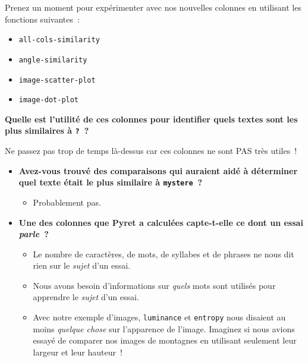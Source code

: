 \documentclass[12pt,a4paper]{article}
\begin{document}
\begin{activitybox}
  Prenez un moment pour expérimenter avec nos nouvelles colonnes en utilisant les fonctions suivantes~:
  \begin{itemize}
    \item \texttt{all-cols-similarity}
    \item \texttt{angle-similarity}
    \item \texttt{image-scatter-plot}
    \item \texttt{image-dot-plot}
  \end{itemize}

  \textbf{Quelle est l'utilité de ces colonnes pour identifier quels textes sont les plus similaires à \texttt{?}~?}
\end{activitybox}

\begin{instructornotes}
  Ne passez pas trop de temps là-dessus car ces colonnes ne sont PAS très utiles~!
\end{instructornotes}

\begin{thinkbox}
  \begin{itemize}
    \item \textbf{Avez-vous trouvé des comparaisons qui auraient aidé à déterminer quel texte était le plus similaire à \texttt{mystere}~?}
    \begin{itemize}
      \item Probablement pas.
    \end{itemize}
    \item \textbf{Une des colonnes que Pyret a calculées capte-t-elle ce dont un essai \emph{parle}~?}
    \begin{itemize}
      \item Le nombre de caractères, de mots, de syllabes et de phrases ne nous dit rien sur le \emph{sujet} d'un essai.
      \item Nous avons besoin d'informations sur \emph{quels} mots sont utilisés pour apprendre le \emph{sujet} d'un essai.
      \item Avec notre exemple d'images, \texttt{luminance} et \texttt{entropy} nous disaient au moins \emph{quelque chose} sur l'apparence de l'image. Imaginez si nous avions essayé de comparer nos images de montagnes en utilisant seulement leur largeur et leur hauteur~!
    \end{itemize}
  \end{itemize}
\end{thinkbox}
\end{document}
